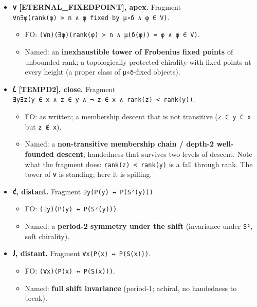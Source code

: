\documentclass[12pt,a4paper]{article}
\begin{document}
\begin{itemize}
\tightlist
\item
  \textbf{𐑫 {[}ETERNAL\_FIXEDPOINT{]}, apex.} Fragment
  \texttt{∀n∃φ(rank(φ)\ \textgreater{}\ n\ ∧\ φ\ fixed\ by\ μ∘δ\ ∧\ φ\ ∈\ V)}.

  \begin{itemize}
  \tightlist
  \item
    FO:
    \texttt{(∀n)(∃φ)(rank(φ)\ \textgreater{}\ n\ ∧\ μ(δ(φ))\ =\ φ\ ∧\ φ\ ∈\ V)}.
  \item
    Named: an \textbf{inexhaustible tower of Frobenius fixed points} of
    unbounded rank; a topologically protected chirality with fixed
    points at every height (a proper class of \texttt{μ∘δ}-fixed
    objects).
  \end{itemize}
\item
  \textbf{𐑖 {[}TEMPD2{]}, close.} Fragment
  \texttt{∃y∃z(y\ ∈\ x\ ∧\ z\ ∈\ y\ ∧\ ¬\ z\ ∈\ x\ ∧\ rank(z)\ \textless{}\ rank(y))}.

  \begin{itemize}
  \tightlist
  \item
    FO: as written; a membership descent that is not transitive
    (\texttt{z\ ∈\ y\ ∈\ x} but \texttt{z\ ∉\ x}).
  \item
    Named: a \textbf{non-transitive membership chain / depth-2
    well-founded descent}; handedness that survives two levels of
    descent. Note what the fragment does:
    \texttt{rank(z)\ \textless{}\ rank(y)} is a fall through rank. The
    tower of 𐑫 is standing; here it is spilling.
  \end{itemize}
\item
  \textbf{𐑒, distant.} Fragment \texttt{∃y(P(y)\ ↔\ P(S²(y)))}.

  \begin{itemize}
  \tightlist
  \item
    FO: \texttt{(∃y)(P(y)\ ↔\ P(S²(y)))}.
  \item
    Named: a \textbf{period-2 symmetry under the shift} (invariance
    under \texttt{S²}, soft chirality).
  \end{itemize}
\item
  \textbf{𐑓, distant.} Fragment \texttt{∀x(P(x)\ ↔\ P(S(x)))}.

  \begin{itemize}
  \tightlist
  \item
    FO: \texttt{(∀x)(P(x)\ ↔\ P(S(x)))}.
  \item
    Named: \textbf{full shift invariance} (period-1; achiral, no
    handedness to break).
  \end{itemize}
\end{itemize}
\end{document}
